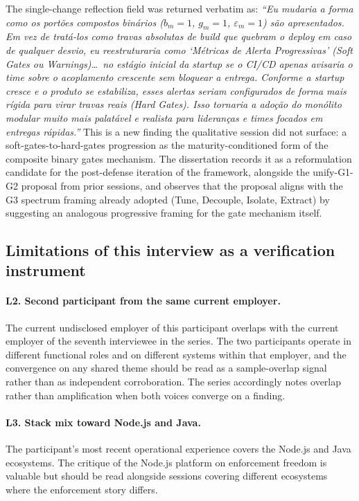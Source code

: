 The single-change reflection field was returned verbatim as: \emph{``Eu mudaria a forma como os port\~oes compostos bin\'arios ($b_m = 1$, $g_m = 1$, $\varepsilon_m = 1$) s\~ao apresentados. Em vez de trat\'a-los como travas absolutas de build que quebram o deploy em caso de qualquer desvio, eu reestruturaria como `M\'etricas de Alerta Progressivas' (Soft Gates ou Warnings)\ldots\ no est\'agio inicial da startup se o CI/CD apenas avisaria o time sobre o acoplamento crescente sem bloquear a entrega. Conforme a startup cresce e o produto se estabiliza, esses alertas seriam configurados de forma mais r\'igida para virar travas reais (Hard Gates). Isso tornaria a ado\c{c}\~ao do mon\'olito modular muito mais palat\'avel e realista para lideran\c{c}as e times focados em entregas r\'apidas.''} This is a new finding the qualitative session did not surface: a soft-gates-to-hard-gates progression as the maturity-conditioned form of the composite binary gates mechanism. The dissertation records it as a reformulation candidate for the post-defense iteration of the framework, alongside the unify-G1-G2 proposal from prior sessions, and observes that the proposal aligns with the G3 spectrum framing already adopted (Tune, Decouple, Isolate, Extract) by suggesting an analogous progressive framing for the gate mechanism itself.

\subsection*{Limitations of this interview as a verification instrument}

\paragraph*{L2. Second participant from the same current employer.} The current undisclosed employer of this participant overlaps with the current employer of the seventh interviewee in the series. The two participants operate in different functional roles and on different systems within that employer, and the convergence on any shared theme should be read as a sample-overlap signal rather than as independent corroboration. The series accordingly notes overlap rather than amplification when both voices converge on a finding.

\paragraph*{L3. Stack mix toward Node.js and Java.} The participant's most recent operational experience covers the Node.js and Java ecosystems. The critique of the Node.js platform on enforcement freedom is valuable but should be read alongside sessions covering different ecosystems where the enforcement story differs.

